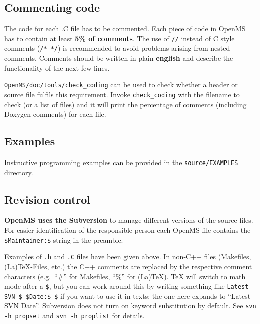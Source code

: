 \documentclass[a4]{article}
\begin{document}
\subsection{Commenting code}

The code for each .C file has to be commented. Each piece of code in OpenMS
has to contain at least {\bf 5\% of comments}. The use of {\tt //} instead of
C style comments ({\tt /* */}) is recommended to avoid problems arising from
nested comments. Comments should be written in plain \textbf{english} and
describe the functionality of the next few lines.

{\tt OpenMS/doc/tools/check\_coding} can be used to check whether a header or
source file fulfils this requirement. Invoke {\tt check\_coding} with the
filename to check (or a list of files) and it will print the percentage of
comments (including Doxygen comments) for each file.


\subsection{Examples}

Instructive programming examples can be provided in the
\texttt{source/EXAMPLES} directory.


\subsection{Revision control}

\textbf{OpenMS uses the Subversion} to manage different
versions of the source files. For easier identification of the responsible person
each OpenMS file contains the \texttt{\$Maintainer{}:\$} string in the
preamble.

Examples of \texttt{.h} and \texttt{.C} files have been given above.  In
non-C++ files (Makefiles, (La)TeX-Files, etc.) the C++ comments are replaced
by the respective comment characters (e.g.\ ``\#'' for Makefiles, ``\%'' for
(La)TeX).  TeX will switch to math mode after a \texttt{\$}, but you can work
around this by writing something like
\mbox{\texttt{Latest SVN \$ \$Date{}:\$ \$}}
if you want to use it in texts; the one here expands to
%
%
``Latest SVN $ $Date$ $''. %
%
Subversion does not turn on keyword substitution by default.  See \texttt{svn
  -h propset} and \texttt{svn -h proplist} for details.
\end{document}
